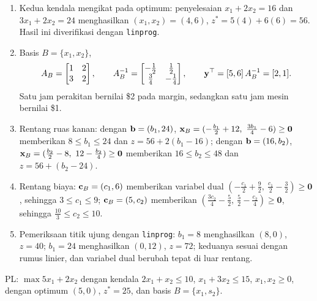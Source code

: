 \begin{enumerate}
\item Kedua kendala mengikat pada optimum: penyelesaian $x_1 + 2x_2 = 16$ dan $3x_1 + 2x_2 = 24$ menghasilkan $(x_1, x_2) = (4, 6)$, $z^* = 5(4) + 6(6) = 56$. Hasil ini diverifikasi dengan \texttt{linprog}.
\item Basis $B = \{x_1, x_2\}$,
\[
A_B = \begin{bmatrix} 1 & 2 \\ 3 & 2 \end{bmatrix}, \qquad
A_B^{-1} = \begin{bmatrix} -\tfrac12 & \tfrac12 \\ \tfrac34 & -\tfrac14 \end{bmatrix},
\qquad
\mathbf{y}^\top = [5,6]\,A_B^{-1} = [2, 1].
\]
Satu jam perakitan bernilai \$2 pada margin, sedangkan satu jam mesin bernilai \$1.
\item Rentang ruas kanan: dengan $\mathbf{b} = (b_1, 24)$, $\x_B = (-\tfrac{b_1}{2} + 12,\ \tfrac{3b_1}{4} - 6) \ge \mathbf{0}$ memberikan $8 \le b_1 \le 24$ dan $z = 56 + 2(b_1 - 16)$; dengan $\mathbf{b} = (16, b_2)$, $\mathbf{x}_B = (\tfrac{b_2}{2} - 8,\ 12 - \tfrac{b_2}{4}) \ge \mathbf{0}$ memberikan $16 \le b_2 \le 48$ dan $z = 56 + (b_2 - 24)$.
\item Rentang biaya: $\mathbf{c}_B = (c_1, 6)$ memberikan variabel dual $(-\tfrac{c_1}{2} + \tfrac92,\ \tfrac{c_1}{2} - \tfrac32) \ge \mathbf{0}$, sehingga $3 \le c_1 \le 9$; $\mathbf{c}_B = (5, c_2)$ memberikan $(\tfrac{3c_2}{4} - \tfrac52,\ \tfrac52 - \tfrac{c_2}{4}) \ge \mathbf{0}$, sehingga $\tfrac{10}{3} \le c_2 \le 10$.
\item Pemeriksaan titik ujung dengan \texttt{linprog}: $b_1 = 8$ menghasilkan $(8,0)$, $z = 40$; $b_1 = 24$ menghasilkan $(0,12)$, $z = 72$; keduanya sesuai dengan rumus linier, dan variabel dual berubah tepat di luar rentang.
\end{enumerate}


PL: $\max 5x_1 + 2x_2$ dengan kendala $2x_1 + x_2 \le 10$, $x_1 + 3x_2 \le 15$, $x_1, x_2 \ge 0$, dengan optimum $(5, 0)$, $z^* = 25$, dan basis $B = \{x_1, s_2\}$.

